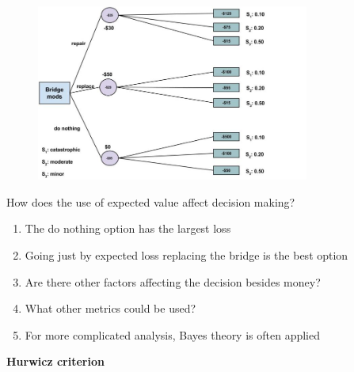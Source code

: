 \documentclass[aspectratio=1610,pdftex,dvipsnames,compress,xcolor={dvipsnames}]{beamer}
\begin{document}
\addtocounter{framenumber}{-1}
\begin{frame}{}
    \begin{figure}
        \centering
        \includegraphics[width=0.80\textwidth]{bridge.mods.expected.jpg}
    \end{figure}
\end{frame}


\begin{frame}{How does the use of expected value affect decision making?}
    \begin{enumerate}[series=outerlist,topsep=0pt,itemsep=21pt,leftmargin=*,label=(\arabic*)]
        \item[]The do nothing option has the largest loss
        \item[]Going just by expected loss replacing the bridge is the best option
        \item[]Are there other factors affecting the decision besides money? 
        \item[]What other metrics could be used?
        \item[]For more complicated analysis, Bayes theory is often applied
    \end{enumerate}
\end{frame}


\begin{frame}[plain]{}
    \centering\LARGE\textbf{Hurwicz criterion}
\end{frame}
\end{document}
